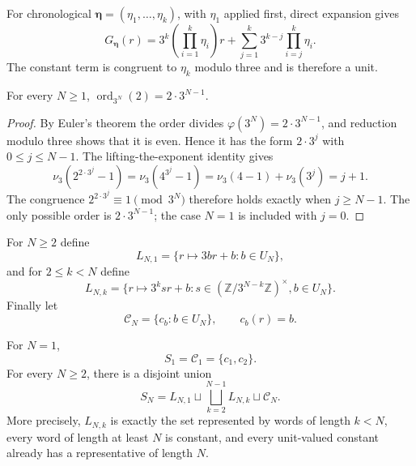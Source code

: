For chronological $\boldsymbol\eta=(\eta_1,\ldots,\eta_k)$, with $\eta_1$
applied first,
direct expansion gives
\begin{equation}
\label{eq:finite-residue-word-affine-formula}
 G_{\boldsymbol\eta}(r)
 =3^k\left(\prod_{i=1}^k \eta_i\right)r
  +\sum_{j=1}^k3^{k-j}\prod_{i=j}^k \eta_i.
\end{equation}
The constant term is congruent to $\eta_k$ modulo three and is therefore a
unit.

\begin{lemma}
\label{lem:order-two-mod-three-power}
For every $N\geq1$,
$\operatorname{ord}_{3^N}(2)=2\cdot3^{N-1}$.
\end{lemma}

\begin{proof}
By Euler's theorem the order divides
$\varphi(3^N)=2\cdot3^{N-1}$, and reduction modulo three shows that it is
even.  Hence it has the form $2\cdot3^j$ with $0\leq j\leq N-1$.  The
lifting-the-exponent
identity gives
\[
 \nu_3(2^{2\cdot3^j}-1)
 =\nu_3(4^{3^j}-1)=\nu_3(4-1)+\nu_3(3^j)=j+1.
\]
The congruence $2^{2\cdot3^j}\equiv1\pmod{3^N}$ therefore holds exactly when
$j\geq N-1$.  The only possible order is $2\cdot3^{N-1}$; the case $N=1$
is included with $j=0$.
\end{proof}

For $N\geq2$ define
\[
 L_{N,1}=\{r\mapsto3br+b:b\in U_N\},
\]
and for $2\leq k<N$ define
\[
 L_{N,k}=\{r\mapsto3^ksr+b:
          s\in(\mathbb Z/3^{N-k}\mathbb Z)^\times, b\in U_N\}.
\]
Finally let
\[
 \mathcal C_N=\{c_b:b\in U_N\},
 \qquad c_b(r)=b.
\]

\begin{theorem}
\label{thm:finite-residue-semigroup-normal-form}
For $N=1$,
\[
 S_1=\mathcal C_1=\{c_1,c_2\}.
\]
For every $N\geq2$, there is a disjoint union
\begin{equation}
\label{eq:finite-residue-semigroup-strata}
 S_N=L_{N,1}\sqcup
     \bigsqcup_{k=2}^{N-1}L_{N,k}\sqcup\mathcal C_N.
\end{equation}
More precisely, $L_{N,k}$ is exactly the set represented by words of length
$k<N$, every word of length at least $N$ is constant, and every unit-valued
constant already has a representative of length $N$.
\end{theorem}

